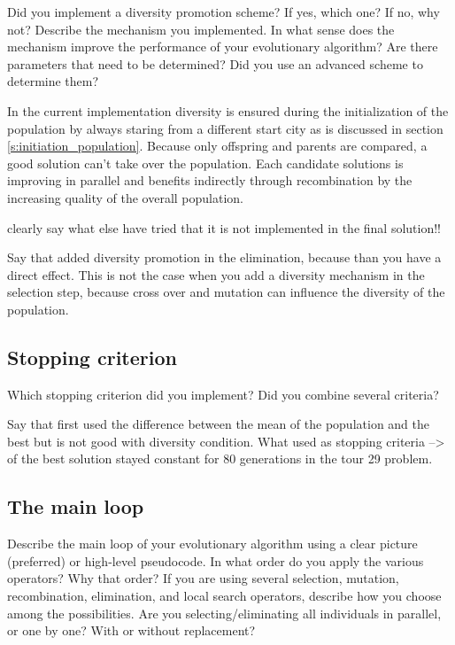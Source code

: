 \documentclass[a4paper,10pt]{article}
\newcommand{\ReplaceMe}[1]{{\color{blue}#1}}
\begin{document}
\ReplaceMe{Did you implement a diversity promotion scheme? If yes, which one? If no, why not? Describe the mechanism you implemented. In what sense does the mechanism improve the performance of your evolutionary algorithm? Are there parameters that need to be determined? Did you use an advanced scheme to determine them?}

In the current implementation diversity is ensured during the initialization of the population by always staring from a different start city as is discussed in section \ref{s:initiation_population}. Because only offspring and parents are compared, a good solution can't take over the population. Each candidate solutions is improving in parallel and benefits indirectly through recombination by the increasing quality of the overall population. 

clearly say what else have tried that it is not implemented in the final solution!!

Say that added diversity promotion in the elimination, because than you have a direct effect. This is not the case when you add a diversity mechanism in the selection step, because cross over and mutation can influence the diversity of the population. 

\subsection{Stopping criterion}

\ReplaceMe{Which stopping criterion did you implement? Did you combine several criteria?}

Say that first used the difference between the mean of the population and the best but is not good with diversity condition. What used as stopping criteria --> of the best solution stayed constant for 80 generations in the tour 29 problem. 

\subsection{The main loop}

\ReplaceMe{Describe the main loop of your evolutionary algorithm using a clear picture (preferred) or high-level pseudocode. In what order do you apply the various operators? Why that order? If you are using several selection, mutation, recombination, elimination, and local search operators, describe how you choose among the possibilities. Are you selecting/eliminating all individuals in parallel, or one by one? With or without replacement?}
\end{document}
